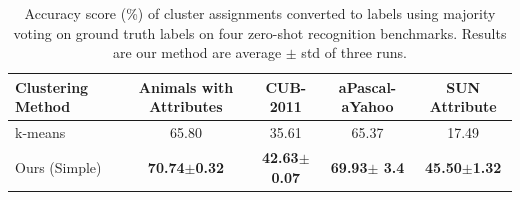 \documentclass[10pt,twocolumn,letterpaper]{article}
\begin{document}
\begin{table}[ht]
\begin{minipage}{\textwidth}
\centering
\caption{Accuracy score (\%) of cluster assignments converted to labels
using majority voting on ground truth labels on four zero-shot recognition benchmarks.
Results are our method are average $\pm$ std of three runs.
} \vspace{2mm} \label{tab:cluster}
\begin{tabular}{|l|c|c|c|c|}
\hline
Clustering Method & Animals with Attributes & CUB-2011 & aPascal-aYahoo & SUN Attribute \\
\hline
k-means                             &  65.80                 & 35.61           & 65.37                & 17.49    \\
\hline
Ours (Simple)                     & \textbf{70.74$\pm$0.32}  & \textbf{42.63$\pm$0.07} & \textbf{69.93$\pm$ 3.4} & \textbf{ 45.50$\pm$1.32} \\
\hline
\end{tabular}
\vspace{2mm}
\end{minipage}
\end{table}
\end{document}
